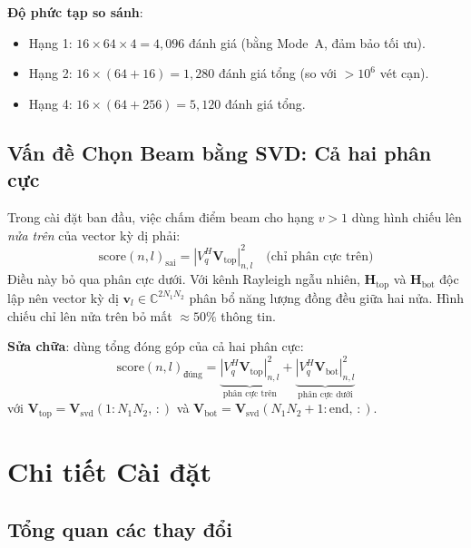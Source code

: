\documentclass[11pt,a4paper]{article}
\begin{document}
\medskip
\noindent\textbf{Độ phức tạp so sánh}:
\begin{itemize}
  \item Hạng 1: $16 \times 64 \times 4 = 4{,}096$ đánh giá (bằng Mode~A, đảm bảo tối ưu).
  \item Hạng 2: $16 \times (64 + 16) = 1{,}280$ đánh giá tổng (so với $> 10^6$ vét cạn).
  \item Hạng 4: $16 \times (64 + 256) = 5{,}120$ đánh giá tổng.
\end{itemize}

\subsection{Vấn đề Chọn Beam bằng SVD: Cả hai phân cực}

Trong cài đặt ban đầu, việc chấm điểm beam cho hạng $v > 1$ dùng hình chiếu lên
\emph{nửa trên} của vector kỳ dị phải:
\begin{equation}
  \text{score}(n,l)_\text{sai} = |V_q^H \mathbf{V}_\text{top}|_{n,l}^2
  \quad \text{(chỉ phân cực trên)}
\end{equation}
Điều này bỏ qua phân cực dưới. Với kênh Rayleigh ngẫu nhiên, $\mathbf{H}_\text{top}$
và $\mathbf{H}_\text{bot}$ độc lập nên vector kỳ dị $\mathbf{v}_l \in \mathbb{C}^{2N_1N_2}$
phân bổ năng lượng đồng đều giữa hai nửa. Hình chiếu chỉ lên nửa trên
bỏ mất $\approx 50\%$ thông tin.

\medskip\noindent\textbf{Sửa chữa}: dùng tổng đóng góp của cả hai phân cực:
\begin{equation}
  \text{score}(n,l)_\text{đúng} =
  \underbrace{|V_q^H \mathbf{V}_\text{top}|_{n,l}^2}_{\text{phân cực trên}}
  + \underbrace{|V_q^H \mathbf{V}_\text{bot}|_{n,l}^2}_{\text{phân cực dưới}}
  \label{eq:score_both}
\end{equation}
với $\mathbf{V}_\text{top} = \mathbf{V}_\text{svd}(1:N_1N_2,\,:)$ và
$\mathbf{V}_\text{bot} = \mathbf{V}_\text{svd}(N_1N_2{+}1:\text{end},\,:)$.

\section{Chi tiết Cài đặt}

\subsection{Tổng quan các thay đổi}
\end{document}
